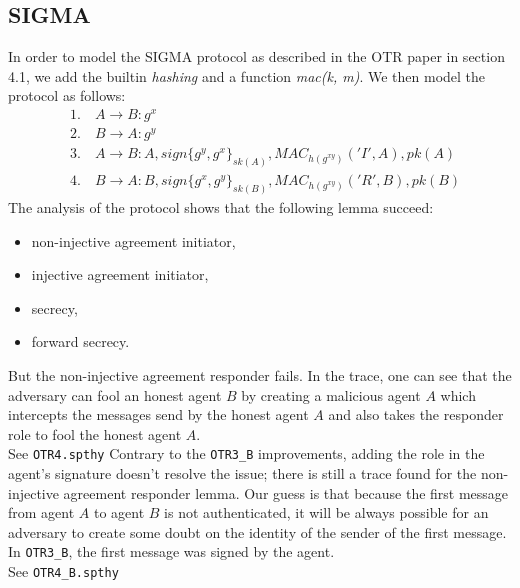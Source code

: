 \documentclass[a4paper,11pt]{scrartcl}
\begin{document}
\subsection{SIGMA}
In order to model the SIGMA protocol as described in the OTR paper in section 4.1, we add the builtin \emph{hashing} and a function \emph{mac(k, m)}. We then model the protocol as follows:
\begin{align*}
&\text{1.} \quad A \rightarrow B: g^x \\
&\text{2.} \quad B \rightarrow A: g^y \\
&\text{3.} \quad A \rightarrow B: A, sign\{g^y, g^x\}_{sk(A)}, MAC_{h(g^{xy})}('I', A), pk(A) \\
&\text{4.} \quad B \rightarrow A: B, sign\{g^x, g^y\}_{sk(B)}, MAC_{h(g^{xy})}('R', B), pk(B)
\end{align*}
The analysis of the protocol shows that the following lemma succeed:
\begin{itemize}
    \item non-injective agreement initiator,
    \item injective agreement initiator,
    \item secrecy,
    \item forward secrecy.
\end{itemize}
But the non-injective agreement responder fails. In the trace, one can see that the adversary can fool an honest agent $B$ by creating a malicious agent $A$ which intercepts the messages send by the honest agent $A$ and also takes the responder role to fool the honest agent $A$.\\
See \texttt{OTR4.spthy}
\newline
Contrary to the \texttt{OTR3\_B} improvements, adding the role in the agent's signature doesn't resolve the issue; there is still a trace found for the non-injective agreement responder lemma. Our guess is that because the first message from agent $A$ to agent $B$ is not authenticated, it will be always possible for an adversary to create some doubt on the identity of the sender of the first message. In \texttt{OTR3\_B}, the first message was signed by the agent.\\
See \texttt{OTR4\_B.spthy}
\end{document}
